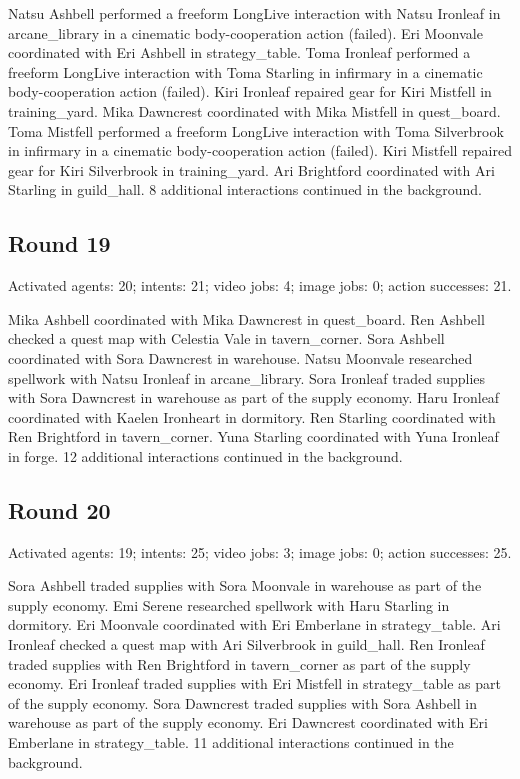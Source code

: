 \documentclass[11pt,a4paper]{article}
\begin{document}
Natsu Ashbell performed a freeform LongLive interaction with Natsu Ironleaf in arcane\_library in a cinematic body-cooperation action (failed). Eri Moonvale coordinated with Eri Ashbell in strategy\_table. Toma Ironleaf performed a freeform LongLive interaction with Toma Starling in infirmary in a cinematic body-cooperation action (failed). Kiri Ironleaf repaired gear for Kiri Mistfell in training\_yard. Mika Dawncrest coordinated with Mika Mistfell in quest\_board. Toma Mistfell performed a freeform LongLive interaction with Toma Silverbrook in infirmary in a cinematic body-cooperation action (failed). Kiri Mistfell repaired gear for Kiri Silverbrook in training\_yard. Ari Brightford coordinated with Ari Starling in guild\_hall. 8 additional interactions continued in the background.

\subsection{Round 19}
Activated agents: 20; intents: 21; video jobs: 4; image jobs: 0; action successes: 21.

Mika Ashbell coordinated with Mika Dawncrest in quest\_board. Ren Ashbell checked a quest map with Celestia Vale in tavern\_corner. Sora Ashbell coordinated with Sora Dawncrest in warehouse. Natsu Moonvale researched spellwork with Natsu Ironleaf in arcane\_library. Sora Ironleaf traded supplies with Sora Dawncrest in warehouse as part of the supply economy. Haru Ironleaf coordinated with Kaelen Ironheart in dormitory. Ren Starling coordinated with Ren Brightford in tavern\_corner. Yuna Starling coordinated with Yuna Ironleaf in forge. 12 additional interactions continued in the background.

\subsection{Round 20}
Activated agents: 19; intents: 25; video jobs: 3; image jobs: 0; action successes: 25.

Sora Ashbell traded supplies with Sora Moonvale in warehouse as part of the supply economy. Emi Serene researched spellwork with Haru Starling in dormitory. Eri Moonvale coordinated with Eri Emberlane in strategy\_table. Ari Ironleaf checked a quest map with Ari Silverbrook in guild\_hall. Ren Ironleaf traded supplies with Ren Brightford in tavern\_corner as part of the supply economy. Eri Ironleaf traded supplies with Eri Mistfell in strategy\_table as part of the supply economy. Sora Dawncrest traded supplies with Sora Ashbell in warehouse as part of the supply economy. Eri Dawncrest coordinated with Eri Emberlane in strategy\_table. 11 additional interactions continued in the background.
\end{document}
